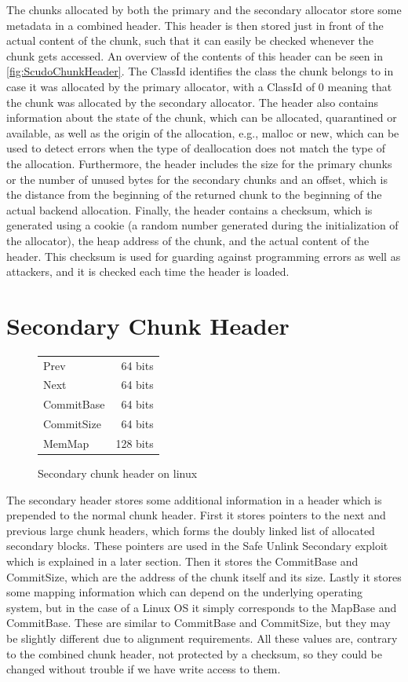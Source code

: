 \documentclass[a4paper,11pt,oneside]{report}
\begin{document}
The chunks allocated by both the primary and the secondary allocator store some metadata
in a combined header. This header is then stored just in front of the actual content of
the chunk, such that it can easily be checked whenever the chunk gets accessed. An
overview of the contents of this header can be seen in \autoref{fig:ScudoChunkHeader}. The
ClassId identifies the class the chunk belongs to in case it was allocated by the primary
allocator, with a ClassId of 0 meaning that the chunk was allocated by the secondary
allocator. The header also contains information about the state of the chunk, which can be
allocated, quarantined or available, as well as the origin of the allocation, e.g., malloc
or new, which can be used to detect errors when the type of deallocation does not match
the type of the allocation. Furthermore, the header includes the size for the primary
chunks or the number of unused bytes for the secondary chunks and an offset, which is the
distance from the beginning of the returned chunk to the beginning of the actual backend
allocation.  Finally, the header contains a checksum, which is generated using a cookie (a
random number generated during the initialization of the allocator), the heap address of
the chunk, and the actual content of the header. This checksum is used for guarding
against programming errors as well as attackers, and it is checked each time the header is
loaded.

\section{Secondary Chunk Header}

\begin{figure}[h]
  \centering
  \begin{tabular}{l r}
    \toprule
    Prev & 64 bits \\
    Next & 64 bits \\
    CommitBase & 64 bits \\
    CommitSize & 64 bits \\
    MemMap & 128 bits \\
    \bottomrule
  \end{tabular}
  \caption{Secondary chunk header on linux}\label{fig:ScudoSecondaryChunkHeader}
\end{figure}

The secondary header stores some additional information in a header which is prepended to
the normal chunk header. First it stores pointers to the next and previous large chunk
headers, which forms the doubly linked list of allocated secondary blocks. These pointers
are used in the Safe Unlink Secondary exploit which is explained in a later section. Then
it stores the CommitBase and CommitSize, which are the address of the chunk itself and its
size. Lastly it stores some mapping information which can depend on the underlying
operating system, but in the case of a Linux OS it simply corresponds to the MapBase and
CommitBase. These are similar to CommitBase and CommitSize, but they may be slightly
different due to alignment requirements. All these values are, contrary to the combined
chunk header, not protected by a checksum, so they could be changed without trouble if we
have write access to them.
\end{document}
